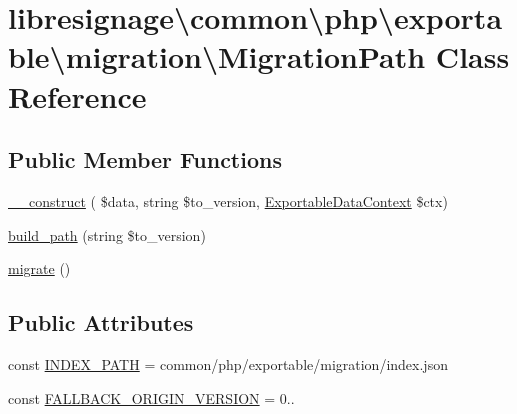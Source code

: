 \hypertarget{classlibresignage_1_1common_1_1php_1_1exportable_1_1migration_1_1MigrationPath}{}\section{libresignage\textbackslash{}common\textbackslash{}php\textbackslash{}exportable\textbackslash{}migration\textbackslash{}Migration\+Path Class Reference}
\label{classlibresignage_1_1common_1_1php_1_1exportable_1_1migration_1_1MigrationPath}
\subsection*{Public Member Functions}
\begin{DoxyCompactItemize}
\item 
\hyperlink{classlibresignage_1_1common_1_1php_1_1exportable_1_1migration_1_1MigrationPath_a25964644f4313a5a97561b3bc0e69dbc}{\+\_\+\+\_\+construct} ( \$data, string \$to\+\_\+version, \hyperlink{classlibresignage_1_1common_1_1php_1_1exportable_1_1ExportableDataContext}{Exportable\+Data\+Context} \$ctx)
\item 
\hyperlink{classlibresignage_1_1common_1_1php_1_1exportable_1_1migration_1_1MigrationPath_a76ac19893ba153e3c8feb45b8f544095}{build\+\_\+path} (string \$to\+\_\+version)
\item 
\hyperlink{classlibresignage_1_1common_1_1php_1_1exportable_1_1migration_1_1MigrationPath_a4503e1f3d421e71c88c94dd189687126}{migrate} ()
\end{DoxyCompactItemize}
\subsection*{Public Attributes}
\begin{DoxyCompactItemize}
\item 
const \hyperlink{classlibresignage_1_1common_1_1php_1_1exportable_1_1migration_1_1MigrationPath_af17153feccda5a3376b6058a4d0da6f9}{I\+N\+D\+E\+X\+\_\+\+P\+A\+TH} = \textquotesingle{}common/php/exportable/migration/index.\+json\textquotesingle{}
\item 
const \hyperlink{classlibresignage_1_1common_1_1php_1_1exportable_1_1migration_1_1MigrationPath_ad6a8d28e28eeec1f57202b64f578c0b7}{F\+A\+L\+L\+B\+A\+C\+K\+\_\+\+O\+R\+I\+G\+I\+N\+\_\+\+V\+E\+R\+S\+I\+ON} = \textquotesingle{}0..\textquotesingle{}
\end{DoxyCompactItemize}


